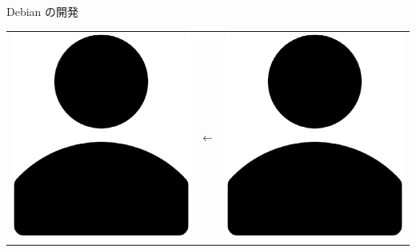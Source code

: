 \begin{frame}[fragile]{Debian の開発}
	\begin{center}
	\begin{tabular}{ccc}
	\includegraphics[scale=0.2]{template-kansai/images/user-solid.eps}	
	&
		${\Huge \leftarrow}$
	&
	\includegraphics[scale=0.2]{template-kansai/images/user-solid.eps}	

\end{tabular}
\end{center}
\end{frame}
